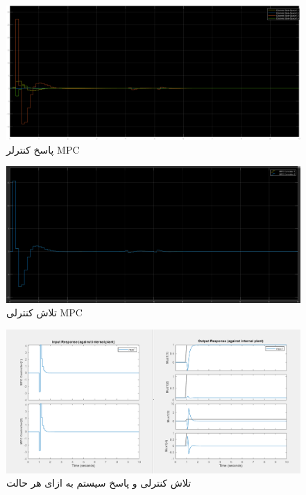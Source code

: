  
 
\begin{figure}[H]
	\centering
	\includegraphics[width=1\linewidth]{../img/Q3_MPC_Output}
	\caption{پاسخ کنترلر MPC}
	\label{fig:q3mpcoutput}
\end{figure}
 
\begin{figure}[H]
	\centering
	\includegraphics[width=1\linewidth]{../img/Q3_MPC_control_effort}
	\caption{تلاش کنترلی MPC}
	\label{fig:q3mpccontroleffort}
\end{figure}
 
 
 \begin{figure}[H]
 	\centering
 	\includegraphics[width=1\linewidth]{../img/Q3_MPC_Setting}
 	\caption{تلاش کنترلی و پاسخ سیستم به ازای هر حالت}
 	\label{fig:q3mpcsetting}
 \end{figure}
 
